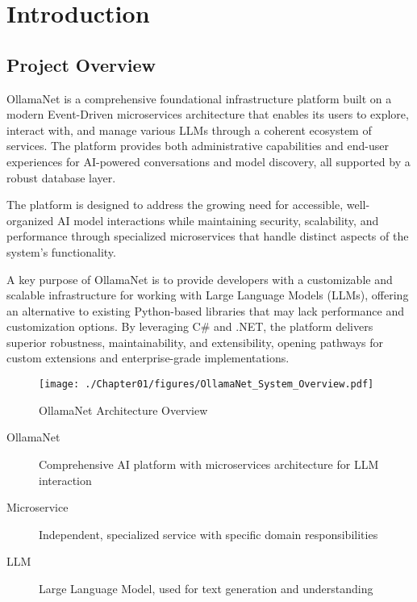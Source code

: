 \def\chapdir{./ChapterIntro}

\chapter{Introduction} \label{ch:intro}

\section{Project Overview}

OllamaNet is a comprehensive foundational infrastructure platform built on a modern Event-Driven microservices architecture that enables its users to explore, interact with, and manage various LLMs through a coherent ecosystem of services. The platform provides both administrative capabilities and end-user experiences for AI-powered conversations and model discovery, all supported by a robust database layer.

The platform is designed to address the growing need for accessible, well-organized AI model interactions while maintaining security, scalability, and performance through specialized microservices that handle distinct aspects of the system's functionality.

A key purpose of OllamaNet is to provide developers with a customizable and scalable infrastructure for working with Large Language Models (LLMs), offering an alternative to existing Python-based libraries that may lack performance and customization options. By leveraging C\# and .NET, the platform delivers superior robustness, maintainability, and extensibility, opening pathways for custom extensions and enterprise-grade implementations.

\begin{sidewaysfigure}[p]
    \centering
    \texttt{[image: ./Chapter01/figures/OllamaNet\_System\_Overview.pdf]}
    \caption{OllamaNet Architecture Overview}
    \label{fig:ollamanet-architecture}
\end{sidewaysfigure}
\clearpage

\begin{terminology}
\begin{description}
\item[OllamaNet] Comprehensive AI platform with microservices architecture for LLM interaction
\item[Microservice] Independent, specialized service with specific domain responsibilities  
\item[LLM] Large Language Model, used for text generation and understanding
\end{description}
\end{terminology}

